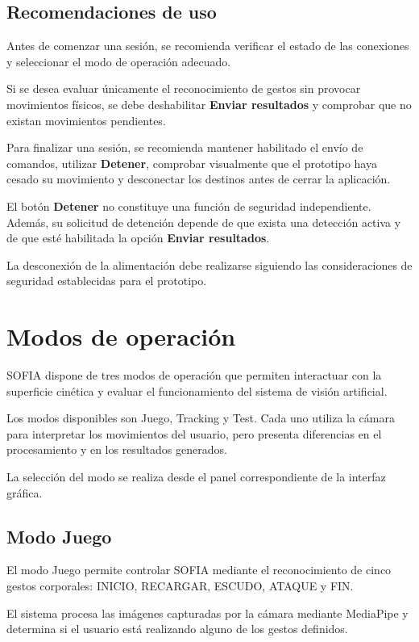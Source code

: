 \documentclass[letterpaper,journal]{IEEEtran}
\begin{document}
\subsection{Recomendaciones de uso}

Antes de comenzar una sesión, se recomienda
verificar el estado de las conexiones y
seleccionar el modo de operación adecuado.

Si se desea evaluar únicamente el
reconocimiento de gestos sin provocar
movimientos físicos, se debe deshabilitar
\textbf{Enviar resultados} y comprobar
que no existan movimientos pendientes.

Para finalizar una sesión, se recomienda
mantener habilitado el envío de comandos,
utilizar \textbf{Detener}, comprobar
visualmente que el prototipo haya cesado
su movimiento y desconectar los destinos
antes de cerrar la aplicación.

El botón \textbf{Detener} no constituye
una función de seguridad independiente.
Además, su solicitud de detención
depende de que exista una detección
activa y de que esté habilitada
la opción \textbf{Enviar resultados}.

La desconexión de la alimentación
debe realizarse siguiendo las
consideraciones de seguridad
establecidas para el prototipo.

\section{Modos de operación}
\label{sec:modos_operacion}

SOFIA dispone de tres modos de operación que permiten
interactuar con la superficie cinética y evaluar el
funcionamiento del sistema de visión artificial.

Los modos disponibles son Juego, Tracking y Test.
Cada uno utiliza la cámara para interpretar los
movimientos del usuario, pero presenta diferencias
en el procesamiento y en los resultados generados.

La selección del modo se realiza desde el panel
correspondiente de la interfaz gráfica.

\subsection{Modo Juego}

El modo Juego permite controlar SOFIA mediante el
reconocimiento de cinco gestos corporales:
INICIO, RECARGAR, ESCUDO, ATAQUE y FIN.

El sistema procesa las imágenes capturadas por la
cámara mediante MediaPipe y determina si el usuario
está realizando alguno de los gestos definidos.
\end{document}
